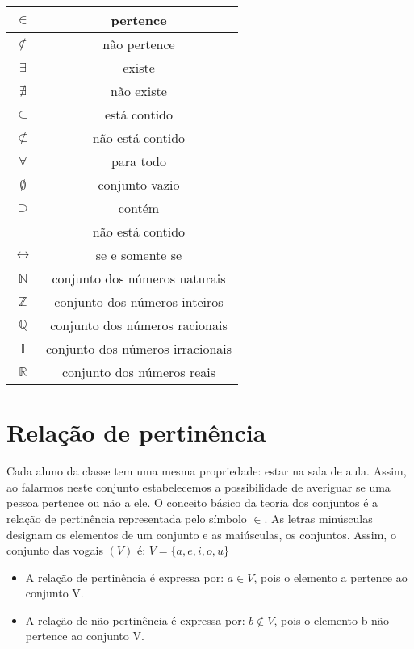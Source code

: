 \begin{center}
\begin{tabular}{|c|c|}
\hline
$\in$ & pertence \\
\hline
$\not\in$ & não pertence\\
\hline
$\exists$ & existe \\
\hline
$\nexists$  & não existe \\
\hline
$\subset$  & está contido \\
\hline
$\not\subset$ & não está contido \\
\hline
$\forall$ & para todo \\
\hline
$\emptyset$  & conjunto vazio \\
\hline
$\supset$  & contém \\
\hline
$|$ & não está contido \\
\hline
$\longleftrightarrow $ & se e somente se \\
\hline
$\mathbb{N}$  & conjunto dos números naturais \\
\hline
$\mathbb{Z}$& conjunto dos números inteiros \\
\hline
$\mathbb{Q}$ & conjunto dos números racionais \\
\hline
$\mathbb{I}$ & conjunto dos números irracionais \\
\hline
$\mathbb{R}$ & conjunto dos números reais \\
\hline
\end{tabular}
\end{center}

\section{Relação de pertinência}

Cada aluno da classe tem uma mesma propriedade: estar na sala de aula. Assim, ao falarmos neste conjunto estabelecemos a possibilidade de averiguar se uma pessoa pertence ou não a ele. O conceito básico da teoria dos conjuntos é a relação de pertinência representada pelo símbolo $\in$. As letras minúsculas designam os elementos de um conjunto e as maiúsculas, os conjuntos. Assim, o conjunto das vogais $(V)$ é: $V = \{a, e, i, o, u\}$

\begin{itemize}
    \item A relação de pertinência é expressa por: $a \in V$, pois o elemento a pertence ao conjunto V.
    \item A relação de não-pertinência é expressa por: $b \not\in V$, pois o elemento b não pertence ao conjunto V.
\end{itemize}

